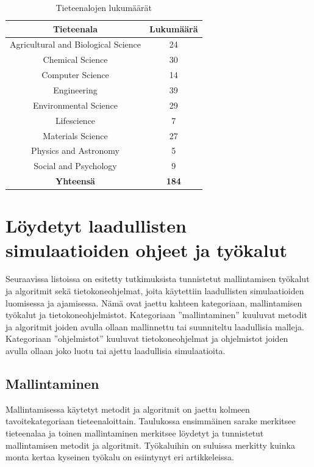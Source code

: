 \documentclass[utf8]{gradu3}
\begin{document}
\begin{table}[ht]
    \centering
    \begin{tabular}{|c|c|}
        \hline
        \textbf{Tieteenala} & \textbf{Lukumäärä} \\
        \hline
        Agricultural and Biological Science & 24 \\
        \hline
        Chemical Science & 30 \\
        \hline
        Computer Science & 14 \\
        \hline
        Engineering & 39 \\
        \hline
        Environmental Science & 29 \\
        \hline
        Lifescience & 7 \\
        \hline
        Materials Science & 27 \\
        \hline
        Physics and Astronomy & 5 \\
        \hline
        Social and Psychology & 9 \\
        \hline
        \textbf{Yhteensä} & \textbf{184} \\
        \hline
    \end{tabular}
    \caption{Tieteenalojen lukumäärät}
    \label{tab:tieteenalat lkm}
\end{table}

\section{Löydetyt laadullisten simulaatioiden ohjeet ja työkalut} \label{tyokalut}
Seuraavissa listoissa on esitetty tutkimuksista tunnistetut mallintamisen työkalut 
ja algoritmit sekä tietokoneohjelmat,
joita käytettiin laadullisten simulaatioiden luomisessa ja ajamisessa. 
Nämä ovat jaettu kahteen kategoriaan, mallintamisen työkalut 
ja tietokoneohjelmistot. 
Kategoriaan ''mallintaminen'' kuuluvat metodit ja algoritmit 
joiden avulla ollaan mallinnettu tai suunniteltu laadullisia malleja.
Kategoriaan ''ohjelmistot'' kuuluvat tietokoneohjelmat ja ohjelmistot 
joiden avulla ollaan joko luotu tai ajettu laadullisia simulaatioita.

\subsection{Mallintaminen}
Mallintamisessa käytetyt metodit ja algoritmit on jaettu kolmeen
tavoitekategoriaan tieteenaloittain. Taulukossa ensimmäinen sarake merkitsee
tieteenalaa  ja toinen mallintaminen merkitsee löydetyt ja tunnistetut 
mallintamisen metodit ja algoritmit. Työkaluihin on suluissa merkitty 
kuinka monta kertaa kyseinen työkalu on esiintynyt eri artikkeleissa.
\end{document}
